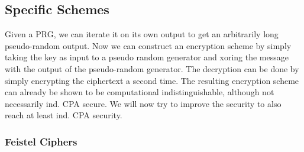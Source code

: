 \subsection{Specific Schemes}

Given a PRG, we can iterate it on its own output to get an arbitrarily long pseudo-random output. Now we can construct an encryption scheme by simply taking the key as input to a pseudo random generator and xoring the message with the output of the pseudo-random generator. The decryption can be done by simply encrypting the ciphertext a second time. The resulting encryption scheme can already be shown to be computational indistinguishable, although not necessarily ind. CPA secure. We will now try to improve the security to also reach at least ind. CPA security. 

\subsubsection{Feistel Ciphers}

